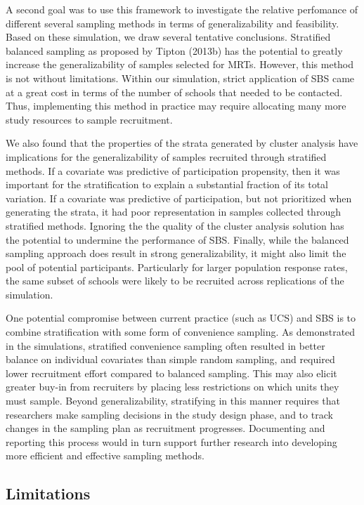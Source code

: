 \documentclass[
  english,
  man,floatsintext]{apa6}
\begin{document}
A second goal was to use this framework to investigate the relative perfomance of different several sampling methods in terms of generalizability and feasibility. Based on these simulation, we draw several tentative conclusions. Stratified balanced sampling as proposed by Tipton (2013b) has the potential to greatly increase the generalizability of samples selected for MRTs. However, this method is not without limitations. Within our simulation, strict application of SBS came at a great cost in terms of the number of schools that needed to be contacted. Thus, implementing this method in practice may require allocating many more study resources to sample recruitment.

We also found that the properties of the strata generated by cluster analysis have implications for the generalizability of samples recruited through stratified methods. If a covariate was predictive of participation propensity, then it was important for the stratification to explain a substantial fraction of its total variation. If a covariate was predictive of participation, but not prioritized when generating the strata, it had poor representation in samples collected through stratified methods. Ignoring the the quality of the cluster analysis solution has the potential to undermine the performance of SBS. Finally, while the balanced sampling approach does result in strong generalizability, it might also limit the pool of potential participants. Particularly for larger population response rates, the same subset of schools were likely to be recruited across replications of the simulation.

One potential compromise between current practice (such as UCS) and SBS is to combine stratification with some form of convenience sampling. As demonstrated in the simulations, stratified convenience sampling often resulted in better balance on individual covariates than simple random sampling, and required lower recruitment effort compared to balanced sampling. This may also elicit greater buy-in from recruiters by placing less restrictions on which units they must sample.
Beyond generalizability, stratifying in this manner requires that researchers make sampling decisions in the study design phase, and to track changes in the sampling plan as recruitment progresses. Documenting and reporting this process would in turn support further research into developing more efficient and effective sampling methods.

\hypertarget{limitations}{%
\subsection{Limitations}\label{limitations}}
\end{document}
